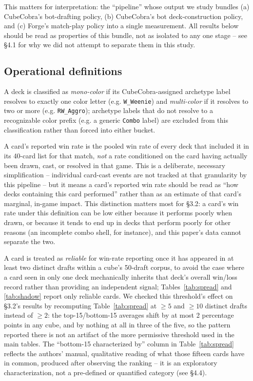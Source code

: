 \documentclass[11pt]{article}
\begin{document}
This matters for interpretation: the ``pipeline'' whose output we study bundles
(a) CubeCobra's bot-drafting policy, (b) CubeCobra's bot deck-construction policy,
and (c) Forge's match-play policy into a single measurement. All results below
should be read as properties of this bundle, not as isolated to any one stage --
see \S4.1 for why we did not attempt to separate them in this study.

\subsection{Operational definitions}

A deck is classified as \emph{mono-color} if its CubeCobra-assigned archetype
label resolves to exactly one color letter (e.g. \texttt{W\_Weenie}) and
\emph{multi-color} if it resolves to two or more (e.g. \texttt{RW\_Aggro});
archetype labels that do not resolve to a recognizable color prefix (e.g. a
generic \texttt{Combo} label) are excluded from this classification rather than
forced into either bucket.

A card's reported win rate is the pooled win rate of every deck that included
it in its 40-card list for that match, \emph{not} a rate conditioned on the card
having actually been drawn, cast, or resolved in that game. This is a
deliberate, necessary simplification -- individual card-cast events are not
tracked at that granularity by this pipeline -- but it means a card's reported
win rate should be read as ``how decks containing this card performed'' rather
than as an estimate of that card's marginal, in-game impact. This distinction
matters most for \S3.2: a card's win rate under this definition can be low
either because it performs poorly when drawn, or because it tends to end up in
decks that perform poorly for other reasons (an incomplete combo shell, for
instance), and this paper's data cannot separate the two.

A card is treated as \emph{reliable} for win-rate reporting once it has
appeared in at least two distinct drafts within a cube's 50-draft corpus, to
avoid the case where a card seen in only one deck mechanically inherits that
deck's overall win/loss record rather than providing an independent signal;
Tables~\ref{tab:spread} and \ref{tab:shadow} report only reliable cards. We
checked this threshold's effect on \S3.2's results by recomputing
Table~\ref{tab:spread} at $\geq 5$ and $\geq 10$ distinct drafts instead of
$\geq 2$: the top-15/bottom-15 averages shift by at most 2 percentage points
in any cube, and by nothing at all in three of the five, so the pattern
reported there is not an artifact of the more permissive threshold used in the
main tables. The ``bottom-15 characterized by'' column in
Table~\ref{tab:spread} reflects the authors' manual, qualitative reading of what
those fifteen cards have in common, produced after observing the ranking -- it is
an exploratory characterization, not a pre-defined or quantified category (see
\S4.4).
\end{document}
